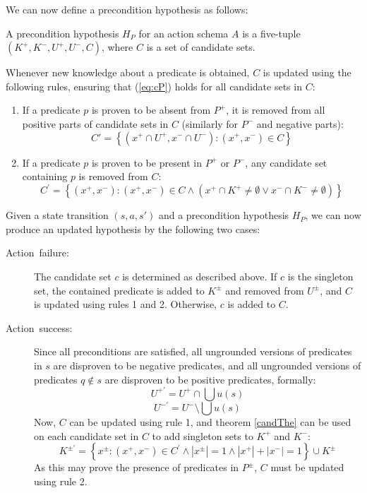 \documentclass[../master.tex]{subfiles}
\begin{document}
We can now define a precondition hypothesis as follows: \begin{defn} A
precondition hypothesis $H_{P}$ for an action schema $A$ is a five-tuple
$\left(K^{+},K^{-},U^{+},U^{-},C\right)$, where $C$ is a set of candidate sets.
\end{defn} Whenever new knowledge about a predicate is obtained, $C$ is updated
using the following rules, ensuring that (\ref{eq:cP}) holds for all candidate
sets in $C$: \begin{enumerate} \item If a predicate $p$ is proven to be absent
from $P^{+}$, it is removed from all positive parts of candidate sets in $C$
(similarly for $P^{-}$ and negative parts): \[ C'=\left\{ \left(x^{+}\cap
U^{+},x^{-}\cap U^{-}\right):\left(x^{+},x^{-}\right)\in C\right\} \]

\item If a predicate $p$ is proven to be present in $P^{+}$ or $P^{-}$, any
candidate set containing $p$ is removed from $C$: \[ C^{\prime}=\left\{
\left(x^{+},x^{-}\right):\left(x^{+},x^{-}\right)\in C\land\left(x^{+}\cap
K^{+}\neq\emptyset\lor x^{-}\cap K^{-}\neq\emptyset\right)\right\} \]

\end{enumerate} Given a state transition $\left(s,a,s'\right)$ and a
precondition hypothesis $H_{P}$, we can now produce an updated hypothesis by the
following two cases: \begin{description} \item [{Action\ failure:}] The
candidate set $c$ is determined as described above. If $c$ is the singleton set,
the contained predicate is added to $K^{\pm}$ and removed from $U^{\pm}$, and
$C$ is updated using rules 1 and 2. Otherwise, $c$ is added to $C$. \item
[{Action\ success:}] Since all preconditions are satisfied, all ungrounded
versions of predicates in $s$ are disproven to be negative predicates, and all
ungrounded versions of predicates $q\notin s$ are disproven to be positive
predicates, formally: \[ U^{+\prime}=U^{+}\cap\bigcup u\left(s\right) \] \[
U^{-\prime}=U^{-}\setminus\bigcup u\left(s\right) \] Now, $C$ can be updated
using rule 1, and theorem \ref{candThe} can be used on each candidate set in $C$
to add singleton sets to $K^{+}$ and $K^{-}$: \[ K^{\pm\prime}=\left\{
x^{\pm}:\left(x^{+},x^{-}\right)\in
C^{\prime}\land\left|x^{\pm}\right|=1\land\left|x^{+}\right|+\left|x^{-}\right|=1\right\}
\cup K^{\pm} \] As this may prove the presence of predicates in $P^{\pm}$, $C$
must be updated using rule 2. \end{description}
\end{document}
